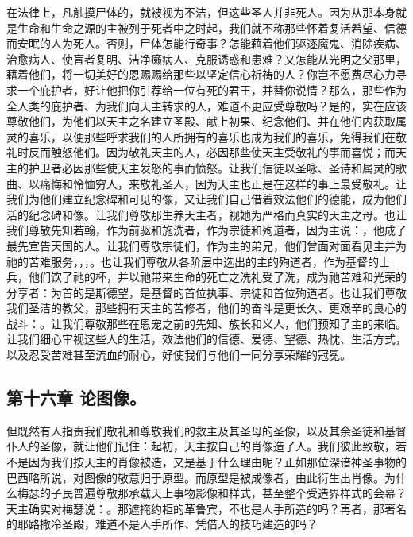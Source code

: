 在法律上，凡触摸尸体的，就被视为不洁，但这些圣人并非死人。因为从那本身就是生命和生命之源的主被列于死者中之时起，我们就不称那些怀着复活希望、信德而安眠的人为死人。否则，尸体怎能行奇事？怎能藉着他们驱逐魔鬼、消除疾病、治愈病人、使盲者复明、洁净癞病人、克服诱惑和患难？又怎能从光明之父那里，藉着他们，将一切美好的恩赐赐给那些以坚定信心祈祷的人？你岂不愿费尽心力寻求一个庇护者，好让他把你引荐给一位有死的君王，并替你说情？那么，那些作为全人类的庇护者、为我们向天主转求的人，难道不更应受尊敬吗？是的，实在应该尊敬他们，为他们以天主之名建立圣殿、献上初果、纪念他们、并在他们内获取属灵的喜乐，以便那些呼求我们的人所拥有的喜乐也成为我们的喜乐，免得我们在敬礼时反而触怒他们。因为敬礼天主的人，必因那些使天主受敬礼的事而喜悦；而天主的护卫者必因那些使天主发怒的事而愤怒。让我们信徒以圣咏、圣诗和属灵的歌曲、以痛悔和怜恤穷人，来敬礼圣人，因为天主也正是在这样的事上最受敬礼。让我们为他们建立纪念碑和可见的像，又让我们自己借着效法他们的德能，成为他们活的纪念碑和像。让我们尊敬那生养天主者，视她为严格而真实的天主之母。也让我们尊敬先知若翰，作为前驱和施洗者，作为宗徒和殉道者，因为主说：，他成了最先宣告天国的人。让我们尊敬宗徒们，作为主的弟兄，他们曾面对面看见主并为祂的苦难服务，，，。也让我们尊敬从各阶层中选出的主的殉道者，作为基督的士兵，他们饮了祂的杯，并以祂带来生命的死亡之洗礼受了洗，成为祂苦难和光荣的分享者：为首的是斯德望，是基督的首位执事、宗徒和首位殉道者。也让我们尊敬我们圣洁的教父，那些拥有天主的苦修者，他们的奋斗是更长久、更艰辛的良心的战斗：。让我们尊敬那些在恩宠之前的先知、族长和义人，他们预知了主的来临。让我们细心审视这些人的生活，效法他们的信德、爱德、望德、热忱、生活方式，以及忍受苦难甚至流血的耐心，好使我们与他们一同分享荣耀的冠冕。\par


\subsection{第十六章 论图像。}

但既然有人指责我们敬礼和尊敬我们的救主及其圣母的圣像，以及其余圣徒和基督仆人的圣像，就让他们记住：起初，天主按自己的肖像造了人。我们彼此致敬，若不是因为我们按天主的肖像被造，又是基于什么理由呢？正如那位深谙神圣事物的巴西略所说，对图像的敬意归于原型。而原型是被成像者，由此衍生出肖像。为什么梅瑟的子民普遍尊敬那承载天上事物影像和样式，甚至整个受造界样式的会幕？天主确实对梅瑟说：。那遮掩约柜的革鲁宾，不也是人手所造的吗？再者，那著名的耶路撒冷圣殿，难道不是人手所作、凭借人的技巧建造的吗？\par

